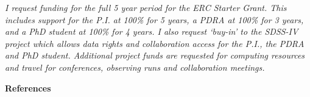 \documentclass[oneside, a4paper, onecolumn, 11pt]{article}
\begin{document}
\smallskip
\smallskip
\noindent
{\it %
I request funding for the full 5 year period for the ERC Starter Grant. This includes support for the P.I. at 100\% for 5 years, a PDRA at 100\% for 3 years, and a PhD student at 100\% for 4 years. I also request `buy-in' to the SDSS-IV project 
which allows data rights and collaboration access for the P.I., the PDRA and PhD student. Additional project funds are requested for computing resources and travel for conferences, observing runs and collaboration meetings.}

\vspace{-10pt}

\begin{center}
\medskip
 \medskip
 {\large \bf References}
    \vspace{-10pt}
\end{center}
\end{document}
